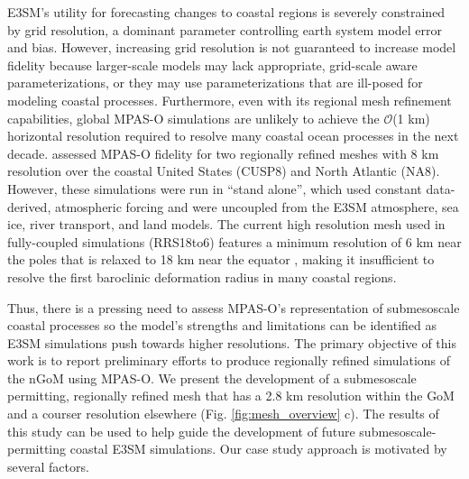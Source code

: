 E3SM’s utility for forecasting changes to coastal regions is severely constrained by grid resolution, a dominant parameter controlling earth system model error and bias. However, increasing grid resolution is not guaranteed to increase model fidelity because larger-scale models may lack appropriate, grid-scale aware parameterizations, or they may use parameterizations that are ill-posed for modeling coastal processes. Furthermore, even with its regional mesh refinement capabilities, global MPAS-O simulations are unlikely to achieve the $\mathcal{O}$(1 km) horizontal resolution required to resolve many coastal ocean processes in the next decade. \cite{hoch2020mpas} assessed MPAS-O fidelity for two regionally refined meshes with 8 km resolution over the coastal United States (CUSP8) and North Atlantic (NA8). However, these simulations were run in ``stand alone'', which used constant data-derived, atmospheric forcing and were uncoupled from the E3SM atmosphere, sea ice, river transport, and land models. The current high resolution mesh used in fully-coupled simulations (RRS18to6) features a minimum resolution of 6 km near the poles that is relaxed to 18 km near the equator \citep[see Fig. 2 of ][]{caldwell2019doe}, making it insufficient to resolve the first baroclinic deformation radius in many coastal regions. 

Thus, there is a pressing need to assess MPAS-O's representation of submesoscale coastal processes so the model's strengths and limitations can be identified as E3SM simulations push towards higher resolutions. The primary objective of this work is to report preliminary efforts to produce regionally refined simulations of the nGoM using MPAS-O. We present the development of a submesoscale permitting, regionally refined mesh that has a 2.8 km resolution within the GoM and a courser resolution elsewhere (Fig. \ref{fig:mesh_overview} c). The results of this study can be used to help guide the development of future submesoscale-permitting coastal E3SM simulations. Our case study approach is motivated by several factors.

